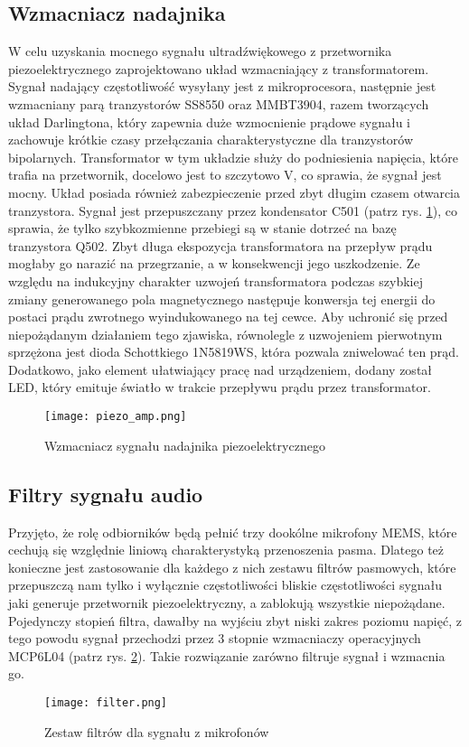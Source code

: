 \subsection{Wzmacniacz nadajnika}
W celu uzyskania mocnego sygnału ultradźwiękowego z przetwornika piezoelektrycznego zaprojektowano układ wzmacniający z transformatorem. 
Sygnał nadający częstotliwość wysyłany jest z mikroprocesora, następnie jest wzmacniany parą tranzystorów SS8550 oraz MMBT3904, razem tworzących układ Darlingtona, 
który zapewnia duże wzmocnienie prądowe sygnału i zachowuje krótkie czasy przełączania charakterystyczne dla tranzystorów bipolarnych.
Transformator w tym układzie służy do podniesienia napięcia, które trafia na przetwornik, docelowo jest to szczytowo \unit[80]{V}, co sprawia, 
że sygnał jest mocny.
Układ posiada również zabezpieczenie przed zbyt długim czasem otwarcia tranzystora. Sygnał jest przepuszczany przez kondensator C501 (patrz rys. \ref{fig:piezo_amp}), 
co sprawia, że tylko szybkozmienne przebiegi są w stanie dotrzeć na bazę tranzystora Q502.
Zbyt długa ekspozycja transformatora na przepływ prądu mogłaby go narazić na przegrzanie, a w konsekwencji jego uszkodzenie.
Ze względu na indukcyjny charakter uzwojeń transformatora podczas szybkiej zmiany generowanego pola magnetycznego następuje 
konwersja tej energii do postaci prądu zwrotnego wyindukowanego na tej cewce. Aby uchronić się przed niepożądanym działaniem tego zjawiska, 
równolegle z uzwojeniem pierwotnym sprzężona jest dioda Schottkiego 1N5819WS, która pozwala zniwelować ten prąd.
Dodatkowo, jako element ułatwiający pracę nad urządzeniem, dodany został LED, który emituje światło w trakcie przepływu prądu przez transformator.
\begin{figure}[ht!]
    \centering
    \texttt{[image: piezo\_amp.png]}
    \caption{Wzmacniacz sygnału nadajnika piezoelektrycznego}
    \label{fig:piezo_amp}
\end{figure}

\subsection{Filtry sygnału audio}

Przyjęto, że rolę odbiorników będą pełnić trzy dookólne mikrofony MEMS, które cechują się względnie liniową charakterystyką przenoszenia pasma. 
Dlatego też konieczne jest zastosowanie dla każdego z nich zestawu filtrów pasmowych, które przepuszczą nam tylko i wyłącznie częstotliwości bliskie częstotliwości 
sygnału jaki generuje przetwornik piezoelektryczny, a zablokują wszystkie niepożądane. 
Pojedynczy stopień filtra, dawałby na wyjściu zbyt niski zakres poziomu napięć, 
z tego powodu sygnał przechodzi przez 3 stopnie wzmacniaczy operacyjnych MCP6L04 (patrz rys. \ref{fig:filter}). Takie rozwiązanie zarówno filtruje sygnał i wzmacnia go.
\begin{figure}[ht!]
    \centering
    \texttt{[image: filter.png]}
    \caption{Zestaw filtrów dla sygnału z mikrofonów}
    \label{fig:filter}
\end{figure}


